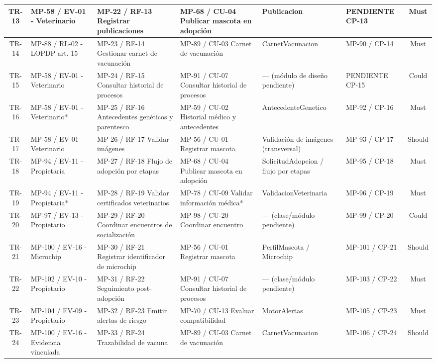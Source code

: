 \documentclass[journal,onecolumn]{IEEEtran}
\begin{document}
\begin{longtable}{|c|p{2.6cm}|p{2.9cm}|p{2.9cm}|p{2.6cm}|p{1.8cm}|c|}
		\hline
		TR-13 & MP-58 / EV-01 - Veterinario & MP-22 / RF-13 Registrar publicaciones & MP-68 / CU-04 Publicar mascota en adopción & Publicacion & PENDIENTE CP-13 & Must \\
		\hline
		TR-14 & MP-88 / RL-02 - LOPDP art. 15 & MP-23 / RF-14 Gestionar carnet de vacunación & MP-89 / CU-03 Carnet de vacunación & CarnetVacunacion & MP-90 / CP-14 & Must \\
		\hline
		TR-15 & MP-58 / EV-01 - Veterinario & MP-24 / RF-15 Consultar historial de procesos & MP-91 / CU-07 Consultar historial de procesos & --- (módulo de diseño pendiente) & PENDIENTE CP-15 & Could \\
		\hline
		TR-16 & MP-58 / EV-01 - Veterinario* & MP-25 / RF-16 Antecedentes genéticos y parentesco & MP-59 / CU-02 Historial médico y antecedentes & AntecedenteGenetico & MP-92 / CP-16 & Must \\
		\hline
		TR-17 & MP-58 / EV-01 - Veterinario & MP-26 / RF-17 Validar imágenes & MP-56 / CU-01 Registrar mascota & Validación de imágenes (transversal) & MP-93 / CP-17 & Should \\
		\hline
		TR-18 & MP-94 / EV-11 - Propietaria & MP-27 / RF-18 Flujo de adopción por etapas & MP-68 / CU-04 Publicar mascota en adopción & SolicitudAdopcion / flujo por etapas & MP-95 / CP-18 & Must \\
		\hline
		TR-19 & MP-94 / EV-11 - Propietaria* & MP-28 / RF-19 Validar certificados veterinarios & MP-78 / CU-09 Validar información médica* & ValidacionVeterinaria & MP-96 / CP-19 & Must \\
		\hline
		TR-20 & MP-97 / EV-13 - Propietario & MP-29 / RF-20 Coordinar encuentros de socialización & MP-98 / CU-20 Coordinar encuentro & --- (clase/módulo pendiente) & MP-99 / CP-20 & Could \\
		\hline
		TR-21 & MP-100 / EV-16 - Microchip & MP-30 / RF-21 Registrar identificador de microchip & MP-56 / CU-01 Registrar mascota & PerfilMascota / Microchip & MP-101 / CP-21 & Should \\
		\hline
		TR-22 & MP-102 / EV-10 - Propietario & MP-31 / RF-22 Seguimiento post-adopción & MP-91 / CU-07 Consultar historial de procesos & --- (clase/módulo pendiente) & MP-103 / CP-22 & Must \\
		\hline
		TR-23 & MP-104 / EV-09 - Propietario & MP-32 / RF-23 Emitir alertas de riesgo & MP-70 / CU-13 Evaluar compatibilidad & MotorAlertas & MP-105 / CP-23 & Must \\
		\hline
		TR-24 & MP-100 / EV-16 - Evidencia vinculada & MP-33 / RF-24 Trazabilidad de vacuna & MP-89 / CU-03 Carnet de vacunación & CarnetVacunacion & MP-106 / CP-24 & Should \\

\end{longtable}
\end{document}
